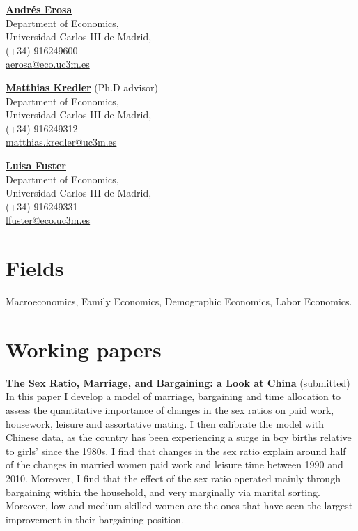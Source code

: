 \documentclass[margin]{res} %
\begin{document}
\begin{resume}
\begin{multicols}{2}
	\href{http://economics.uc3m.es/personal/andres-erosa/}{\bf{Andr\'es Erosa}}  \\
	Department of Economics, \\
	Universidad Carlos III de Madrid, \\
	(+34) 916249600 \\
	\href{mailto:aerosa@eco.uc3m.es}{aerosa@eco.uc3m.es}
	
	\columnbreak
	
	\href{http://www.eco.uc3m.es/~mkredler/}{\bf{Matthias Kredler}} (Ph.D advisor)\\
	Department of Economics, \\
	Universidad Carlos III de Madrid, \\
	(+34) 916249312 \\
	\href{mailto:matthias.kredler@uc3m.es}{matthias.kredler@uc3m.es}
	
	\href{http://economics.uc3m.es/personal/luisa-fuster/}{\bf{Luisa Fuster}} \\
	Department of Economics, \\
	Universidad Carlos III de Madrid, \\
	(+34) 916249331 \\
	\href{mailto:lfuster@eco.uc3m.es}{lfuster@eco.uc3m.es}
	
\end{multicols}

\section{Fields}

Macroeconomics, Family Economics, Demographic Economics, Labor Economics.

\section{Working papers}
{\bf The Sex Ratio, Marriage, and Bargaining: a Look at China} (submitted) \\
In this paper I develop a model of marriage, bargaining and time allocation to assess the quantitative importance of changes in the sex ratios on paid work, housework, leisure and assortative mating. I then calibrate the model with Chinese data, as the country has been experiencing a surge in boy births relative to girls' since the 1980s. I find that changes in the sex ratio explain around half of the changes in married women paid work and leisure time between 1990 and 2010. Moreover, I find that the effect of the sex ratio operated mainly through bargaining within the household, and very marginally via marital sorting. Moreover, low and medium skilled women are the ones that have seen the largest improvement in their bargaining position.


\end{resume}
\end{document}
